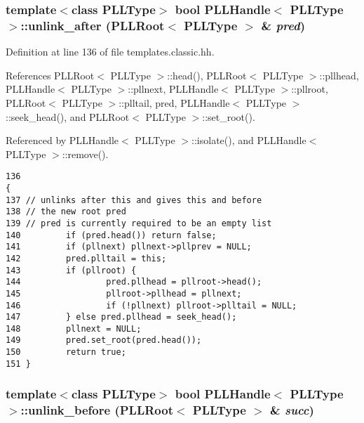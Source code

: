 \subsubsection{\setlength{\rightskip}{0pt plus 5cm}template$<$class PLLType$>$ bool PLLHandle$<$ {\bf PLLType} $>$::unlink\_\-after ({\bf PLLRoot}$<$ {\bf PLLType} $>$ \& {\em pred})\hspace{0.3cm}{\tt  [inline]}}\label{classPLLHandle_a11}




Definition at line 136 of file templates.classic.hh.

References PLLRoot$<$ PLLType $>$::head(), PLLRoot$<$ PLLType $>$::pllhead, PLLHandle$<$ PLLType $>$::pllnext, PLLHandle$<$ PLLType $>$::pllroot, PLLRoot$<$ PLLType $>$::plltail, pred, PLLHandle$<$ PLLType $>$::seek\_\-head(), and PLLRoot$<$ PLLType $>$::set\_\-root().

Referenced by PLLHandle$<$ PLLType $>$::isolate(), and PLLHandle$<$ PLLType $>$::remove().



\footnotesize\begin{verbatim}136                                                                     { 
137 // unlinks after this and gives this and before
138 // the new root pred
139 // pred is currently required to be an empty list
140         if (pred.head()) return false; 
141         if (pllnext) pllnext->pllprev = NULL; 
142         pred.plltail = this; 
143         if (pllroot) { 
144                 pred.pllhead = pllroot->head(); 
145                 pllroot->pllhead = pllnext; 
146                 if (!pllnext) pllroot->plltail = NULL; 
147         } else pred.pllhead = seek_head(); 
148         pllnext = NULL; 
149         pred.set_root(pred.head()); 
150         return true; 
151 } 
\end{verbatim}\normalsize 
{}
\subsubsection{\setlength{\rightskip}{0pt plus 5cm}template$<$class PLLType$>$ bool PLLHandle$<$ {\bf PLLType} $>$::unlink\_\-before ({\bf PLLRoot}$<$ {\bf PLLType} $>$ \& {\em succ})\hspace{0.3cm}{\tt  [inline]}}\label{classPLLHandle_a49}


